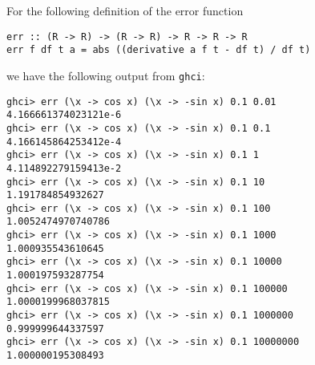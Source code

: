 \documentclass{article}
\begin{document}
\begin{itemize}
    \qquad For the following definition of the error function
    \begin{verbatim}
err :: (R -> R) -> (R -> R) -> R -> R -> R
err f df t a = abs ((derivative a f t - df t) / df t)   
    \end{verbatim}
    we have the following output from \verb|ghci|:
    \begin{verbatim}
ghci> err (\x -> cos x) (\x -> -sin x) 0.1 0.01
4.166661374023121e-6
ghci> err (\x -> cos x) (\x -> -sin x) 0.1 0.1
4.166145864253412e-4
ghci> err (\x -> cos x) (\x -> -sin x) 0.1 1
4.114892279159413e-2
ghci> err (\x -> cos x) (\x -> -sin x) 0.1 10
1.191784854932627
ghci> err (\x -> cos x) (\x -> -sin x) 0.1 100
1.0052474970740786
ghci> err (\x -> cos x) (\x -> -sin x) 0.1 1000
1.000935543610645
ghci> err (\x -> cos x) (\x -> -sin x) 0.1 10000
1.000197593287754
ghci> err (\x -> cos x) (\x -> -sin x) 0.1 100000
1.0000199968037815
ghci> err (\x -> cos x) (\x -> -sin x) 0.1 1000000
0.999999644337597
ghci> err (\x -> cos x) (\x -> -sin x) 0.1 10000000
1.000000195308493
    \end{verbatim}
\end{itemize}
\end{document}
